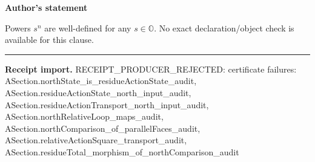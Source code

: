 \documentclass[11pt]{article}
\newcommand{\OO}{\mathbb{O}}
\theoremstyle{plain}
\theoremstyle{definition}
\theoremstyle{remark}
\begin{document}
\begin{tcolorbox}[provenancecard,title={10. Corollary},title after break={10. Corollary (continued)}]
\textbf{Author's statement}\par
Powers $s^n$ are well-defined for any $s\in\OO$.
\tcblower
\textcolor{KgtRed}{No exact declaration/object check is available for this clause.}
\medskip\hrule\medskip
\textbf{Receipt import.} \textcolor{KgtRed}{RECEIPT\_PRODUCER\_REJECTED: certificate failures: ASection.northState\_is\_residueActionState\_audit, ASection.residueActionState\_north\_input\_audit, ASection.residueActionTransport\_north\_input\_audit, ASection.northRelativeLoop\_maps\_audit, ASection.northComparison\_of\_parallelFaces\_audit, ASection.relativeActionSquare\_transport\_audit, ASection.residueTotal\_morphism\_of\_northComparison\_audit}
\end{tcolorbox}
\medskip
\end{document}
